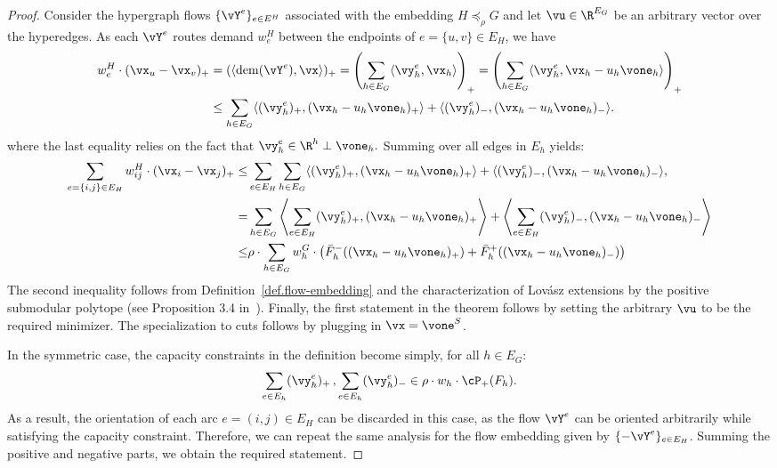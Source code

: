 \documentclass[letterpaper]{article}
\newcommand{\dem}{\operatorname{dem}}
\begin{document}
\flowembedding*
\begin{proof}
Consider the hypergraph flows $\{\vY^e\}_{e \in E^H}$ associated with the embedding $H \preceq_{\rho} G$ and let $\vu \in \R^{E_G}$ be an arbitrary vector over the hyperedges. As each $\vY^{e}$ routes demand $w^H_{e}$ between the endpoints of $e=\{u,v\} \in E_H$, we have
\begin{align*}
w^H_{e} \cdot (\vx_u - \vx_v)_+ &=
(\langle \dem(\vY^e), \vx \rangle)_+ =
\left(\sum_{h \in E_G}  \langle \vy^e_h , \vx_h\rangle\right)_+ =
\left(\sum_{h \in E_G}  \langle \vy^e_h , \vx_h - u_h \vone_h \rangle\right)_+ \\
& \leq \sum_{h \in E_G}  \langle (\vy^e_h)_+ , (\vx_h - u_h \vone_h)_+ \rangle +  \langle (\vy^e_h)_- , (\vx_h - u_h \vone_h)_- \rangle.
\end{align*}
\noindent
where the last equality relies on the fact that $\vy^e_h \in \R^h \perp \vone_h.$
Summing over all edges in $E_h$ yields:
\begin{align*}
\sum_{e=\{i,j\} \in E_H} w^H_{ij} \cdot (\vx_i - \vx_j)_+ \leq
&\sum_{e \in E_H} \sum_{h \in E_G}    \langle (\vy^e_h)_+ , (\vx_h - u_h \vone_h)_+ \rangle + \langle (\vy^e_h)_- , (\vx_h - u_h \vone_h)_- \rangle, \\
= &
 \sum_{h \in E_G}   \left\langle \sum_{e \in E_H}(\vy^e_h)_+ , (\vx_h - u_h \vone_h)_+\right \rangle +  \left\langle \sum_{e \in E_H}(\vy^e_h)_- , (\vx_h - u_h \vone_h)_- \right \rangle\\
\leq & \rho \cdot \sum_{h \in E_G} w^G_h \cdot \left(\bar{F}_h^-((\vx_h - u_h \vone_h)_+) + \bar{F}_h^+((\vx_h - u_h \vone_h)_-)\right)
\end{align*}
The second inequality follows from Definition~\ref{def.flow-embedding} and the characterization of Lov\'asz extensions by the positive submodular polytope (see Proposition 3.4 in~\cite{bach2013learning}).
Finally, the first statement in the theorem follows by setting the arbitrary $\vu$ to be the required minimizer. The specialization to cuts follows by plugging in $\vx = \vone^S$.

In the symmetric case, the capacity constraints in the definition become simply, for all $h \in E_G$:
\begin{equation*}
\sum_{e \in E_h} (\vy^e_h)_+ \,, \sum_{e \in E_h} (\vy^e_h)_-  \in \rho \cdot  w_h \cdot \cP_+(F_h).
\end{equation*}
As a result, the orientation of each arc $e=(i,j) \in E_H$ can be discarded in this case, as the flow $\vY^e$ can be oriented arbitrarily while satisfying the capacity constraint. Therefore, we can repeat the same analysis for the flow embedding given by $\{-\vY^e\}_{e \in E_H}$. Summing the positive and negative parts, we obtain the required statement.
\end{proof}
\end{document}
